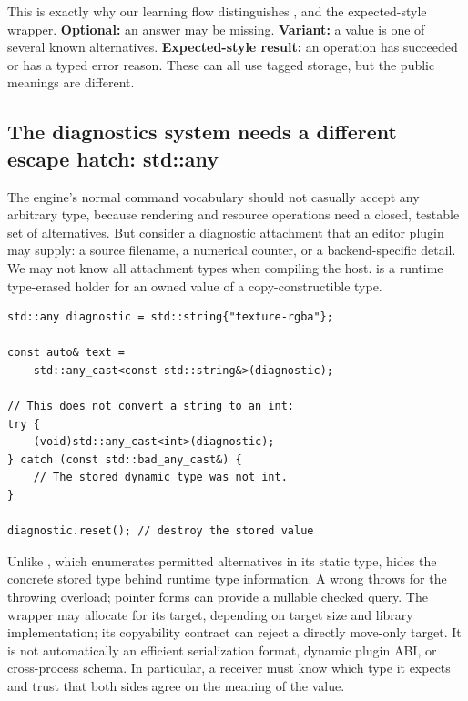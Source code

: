 This is exactly why our learning flow distinguishes ,  and the expected-style wrapper. \textbf{Optional:} an answer may be missing. \textbf{Variant:} a value is one of several known alternatives. \textbf{Expected-style result:} an operation has succeeded or has a typed error reason. These can all use tagged storage, but the public meanings are different.

\subsection{The diagnostics system needs a different escape hatch: std::any}\label{05-engine-i-ch006-the-diagnostics-system-needs-a-different-escape-hatch-stdany}

\hypertarget{05-engine-i-ch006-the-diagnostics-system-needs-a-different-escape-hatch-stdany}{}

The engine's normal command vocabulary should not casually accept any arbitrary type, because rendering and resource operations need a closed, testable set of alternatives. But consider a diagnostic attachment that an editor plugin may supply: a source filename, a numerical counter, or a backend-specific detail. We may not know all attachment types when compiling the host.  is a runtime type-erased holder for an owned value of a copy-constructible type.

\begin{verbatim}
std::any diagnostic = std::string{"texture-rgba"};

const auto& text =
    std::any_cast<const std::string&>(diagnostic);

// This does not convert a string to an int:
try {
    (void)std::any_cast<int>(diagnostic);
} catch (const std::bad_any_cast&) {
    // The stored dynamic type was not int.
}

diagnostic.reset(); // destroy the stored value
\end{verbatim}

Unlike , which enumerates permitted alternatives in its static type,  hides the concrete stored type behind runtime type information. A wrong  throws  for the throwing overload; pointer forms can provide a nullable checked query. The wrapper may allocate for its target, depending on target size and library implementation; its copyability contract can reject a directly move-only target. It is not automatically an efficient serialization format, dynamic plugin ABI, or cross-process schema. In particular, a receiver must know which type it expects and trust that both sides agree on the meaning of the value.

